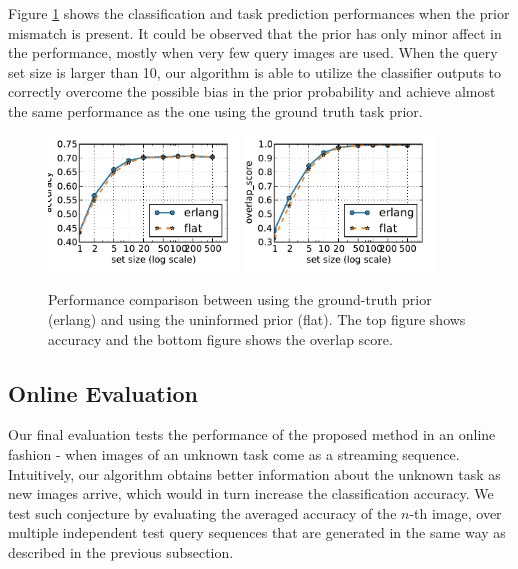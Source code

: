 Figure \ref{fig:adapt:prior} shows the classification and task prediction performances when the prior mismatch is present. It could be observed that the prior has only minor affect in the performance, mostly when very few query images are used. When the query set size is larger than 10, our algorithm is able to utilize the classifier outputs to correctly overcome the possible bias in the prior probability and achieve almost the same performance as the one using the ground truth task prior.

\begin{figure}
    \centering
        \includegraphics[width=0.45\textwidth]{figs/taskadaptation/diffprior_accuracy.pdf}
        \includegraphics[width=0.45\textwidth]{figs/taskadaptation/diffprior_overlap_score.pdf}
    \caption{Performance comparison between using the ground-truth prior (erlang) and using the uninformed prior (flat). The top figure shows accuracy and the bottom figure shows the overlap score.}\label{fig:adapt:prior}
\end{figure}


\subsection{Online Evaluation}\label{subsec:online}
Our final evaluation tests the performance of the proposed method in an online fashion - when images of an unknown task come as a streaming sequence. Intuitively, our algorithm obtains better information about the unknown task as new images arrive, which would in turn increase the classification accuracy. We test such conjecture by evaluating the averaged accuracy of the $n$-th image, over multiple independent test query sequences that are generated in the same way as described in the previous subsection.

